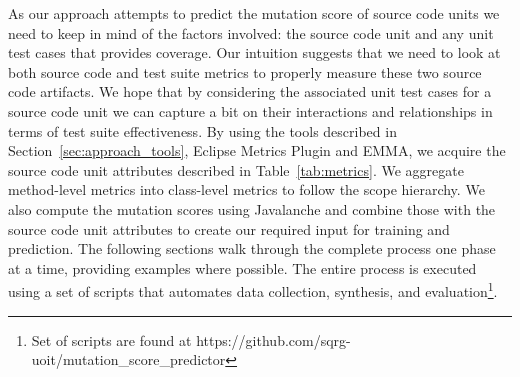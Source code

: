 As our approach attempts to predict the mutation score of source code units we need to keep in mind of the factors involved: the source code unit and any unit test cases that provides coverage. Our intuition suggests that we need to look at both source code and test suite metrics to properly measure these two source code artifacts. We hope that by considering the associated unit test cases for a source code unit we can capture a bit on their interactions and relationships in terms of test suite effectiveness. By using the tools described in Section~\ref{sec:approach_tools}, Eclipse Metrics Plugin and EMMA, we acquire the source code unit attributes described in Table~\ref{tab:metrics}. We aggregate method-level metrics into class-level metrics to follow the scope hierarchy. We also compute the mutation scores using Javalanche and combine those with the source code unit attributes to create our required input for training and prediction. The following sections walk through the complete process one phase at a time, providing examples where possible. The entire process is executed using a set of scripts that automates data collection, synthesis, and evaluation\footnote{Set of scripts are found at https://github.com/sqrg-uoit/mutation\_score\_predictor}.

